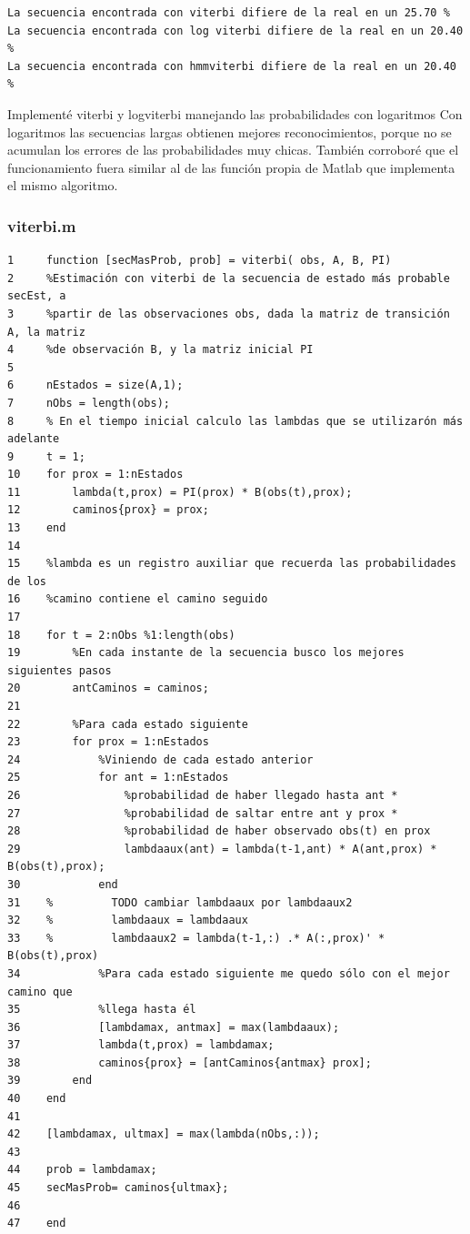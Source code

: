 \documentclass[11pt,a4paper,final]{article}
\begin{document}
\begin{verbatim}La secuencia encontrada con viterbi difiere de la real en un 25.70 %
La secuencia encontrada con log viterbi difiere de la real en un 20.40 %
La secuencia encontrada con hmmviterbi difiere de la real en un 20.40 %
\end{verbatim}
    
Implementé viterbi y logviterbi manejando las probabilidades con logaritmos Con logaritmos las secuencias largas obtienen mejores reconocimientos, porque no se acumulan los errores de las probabilidades muy chicas. También corroboré que el funcionamiento fuera similar al de las función propia de Matlab que implementa el mismo algoritmo.



\subsubsection*{viterbi.m}

\begin{verbatim}
1     function [secMasProb, prob] = viterbi( obs, A, B, PI)
2     %Estimación con viterbi de la secuencia de estado más probable secEst, a 
3     %partir de las observaciones obs, dada la matriz de transición A, la matriz
4     %de observación B, y la matriz inicial PI
5     
6     nEstados = size(A,1);
7     nObs = length(obs);
8     % En el tiempo inicial calculo las lambdas que se utilizarón más adelante
9     t = 1;
10    for prox = 1:nEstados
11        lambda(t,prox) = PI(prox) * B(obs(t),prox);
12        caminos{prox} = prox;
13    end
14        
15    %lambda es un registro auxiliar que recuerda las probabilidades de los 
16    %camino contiene el camino seguido 
17    
18    for t = 2:nObs %1:length(obs)
19        %En cada instante de la secuencia busco los mejores siguientes pasos
20        antCaminos = caminos;
21        
22        %Para cada estado siguiente
23        for prox = 1:nEstados 
24            %Viniendo de cada estado anterior
25            for ant = 1:nEstados
26                %probabilidad de haber llegado hasta ant *
27                %probabilidad de saltar entre ant y prox *
28                %probabilidad de haber observado obs(t) en prox
29                lambdaaux(ant) = lambda(t-1,ant) * A(ant,prox) * B(obs(t),prox);
30            end
31    %         TODO cambiar lambdaaux por lambdaaux2
32    %         lambdaaux = lambdaaux
33    %         lambdaaux2 = lambda(t-1,:) .* A(:,prox)' * B(obs(t),prox)
34            %Para cada estado siguiente me quedo sólo con el mejor camino que 
35            %llega hasta él
36            [lambdamax, antmax] = max(lambdaaux);
37            lambda(t,prox) = lambdamax;
38            caminos{prox} = [antCaminos{antmax} prox];
39        end
40    end
41    
42    [lambdamax, ultmax] = max(lambda(nObs,:));
43    
44    prob = lambdamax;
45    secMasProb= caminos{ultmax};
46    
47    end
\end{verbatim}
    
\end{document}
